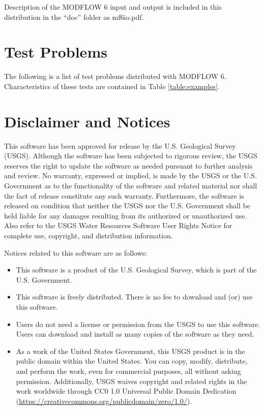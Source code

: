 \documentclass[11pt,twoside,twocolumn]{usgsreport}
\begin{document}
\noindent Description of the MODFLOW 6 input and output is included in this distribution in the ``doc'' folder as mf6io.pdf.

\section{Test Problems}
The following is a list of test problems distributed with MODFLOW 6.  Characteristics of these tests are contained in Table \ref{table:examples}.







\section{Disclaimer and Notices}

This software has been approved for release by the U.S. Geological Survey (USGS). Although the software has been subjected to rigorous review, the USGS reserves the right to update the software as needed pursuant to further analysis and review. No warranty, expressed or implied, is made by the USGS or the U.S. Government as to the functionality of the software and related material nor shall the fact of release constitute any such warranty. Furthermore, the software is released on condition that neither the USGS nor the U.S. Government shall be held liable for any damages resulting from its authorized or unauthorized use. Also refer to the USGS Water Resources Software User Rights Notice for complete use, copyright, and distribution information.

Notices related to this software are as follows:
\begin{itemize}
\item This software is a product of the U.S. Geological Survey, which is part of the U.S. Government.

\item This software is freely distributed. There is no fee to download and (or) use this software.

\item Users do not need a license or permission from the USGS to use this software. Users can download and install as many copies of the software as they need.

\item As a work of the United States Government, this USGS product is in the public domain within the United States. You can copy, modify, distribute, and perform the work, even for commercial purposes, all without asking permission. Additionally, USGS waives copyright and related rights in the work worldwide through CC0 1.0 Universal Public Domain Dedication (\url{https://creativecommons.org/publicdomain/zero/1.0/}).
\end{itemize}
\end{document}
